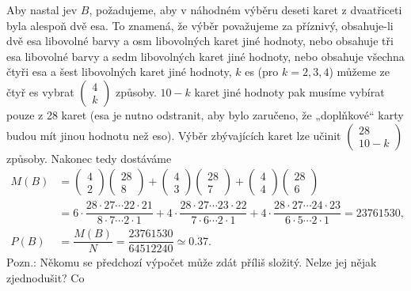 \begin{example}
    Aby nastal jev \(B\), požadujeme, aby v náhodném výběru deseti karet z dvaatřiceti byla alespoň 
    dvě esa. To znamená, že výběr považujeme za příznivý, obsahuje-li dvě esa libovolné barvy a osm 
    libovolných karet jiné hodnoty, nebo obsahuje tři esa libovolné barvy a sedm libovolných karet 
    jiné hodnoty, nebo obsahuje všechna čtyři esa a šest libovolných karet jiné hodnoty, \(k\) es 
    (pro \(k = 2, 3, 4\)) můžeme ze čtyř es vybrat \(\begin{pmatrix} 4 \\ k\end{pmatrix}\) způsoby.
    \(10 - k\) karet jiné hodnoty pak musíme vybírat pouze z \num{28} karet (esa je nutno 
    odstranit, aby bylo zaručeno, že „doplňkové“ karty budou mít jinou hodnotu než eso). Výběr 
    zbývajících karet lze učinit \(\begin{pmatrix} 28 \\ 10 - k\end{pmatrix}\) způsoby. Nakonec 
    tedy dostáváme
    \begin{align*}
      M(B) &=  \begin{pmatrix} 4 \\ 2\end{pmatrix}\begin{pmatrix} 28 \\ 8\end{pmatrix}
              +\begin{pmatrix} 4 \\ 3\end{pmatrix}\begin{pmatrix} 28 \\ 7\end{pmatrix}
              +\begin{pmatrix} 4 \\ 4\end{pmatrix}\begin{pmatrix} 28 \\ 6\end{pmatrix}         \\
           &=  6\cdot\dfrac{28\cdot27\cdots22\cdot21}{8\cdot7\cdots2\cdot1}
              +4\cdot\dfrac{28\cdot27\cdots23\cdot22}{7\cdot6\cdots2\cdot1}
              +4\cdot\dfrac{28\cdot27\cdots24\cdot23}{6\cdot5\cdots2\cdot1} = \num{23761530},  \\
      P(B) &= \dfrac{M(B)}{N} = \dfrac{\num{23761530}}{\num{64512240}} \simeq\num{0.37}.
    \end{align*}
    Pozn.: Někomu se předchozí výpočet může zdát příliš složitý. Nelze jej nějak zjednodušit? Co 

\end{example}
